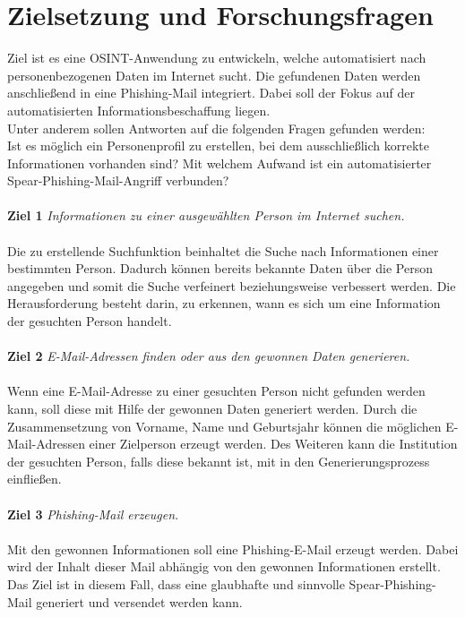 \section{Zielsetzung und Forschungsfragen}
\label {sec:Zielsetzung}
Ziel ist es eine OSINT-Anwendung zu entwickeln, welche automatisiert nach personenbezogenen Daten im Internet sucht. Die gefundenen Daten werden anschließend in eine Phishing-Mail integriert. Dabei soll der Fokus auf der automatisierten Informationsbeschaffung liegen.\\ 
Unter anderem sollen Antworten auf die folgenden Fragen gefunden werden:\\ Ist es möglich ein Personenprofil zu erstellen, bei dem ausschließlich korrekte Informationen vorhanden sind? Mit welchem Aufwand ist ein automatisierter Spear-Phishing-Mail-Angriff verbunden?
 \\\\
 {\bf Ziel 1} \textit{Informationen zu einer ausgewählten Person im Internet suchen.}\\\\
 Die zu erstellende Suchfunktion beinhaltet die Suche nach Informationen einer bestimmten Person. Dadurch können bereits bekannte Daten über die Person angegeben und somit die Suche verfeinert beziehungsweise verbessert werden. Die Herausforderung besteht darin, zu erkennen, wann es sich um eine Information der gesuchten Person handelt.\\\\
 {\bf Ziel 2} \textit{E-Mail-Adressen finden oder aus den gewonnen Daten generieren.}\\\\
 Wenn eine E-Mail-Adresse zu einer gesuchten Person nicht gefunden werden kann, soll diese mit Hilfe der gewonnen Daten generiert werden. Durch die Zusammensetzung von Vorname, Name und Geburtsjahr können die möglichen E-Mail-Adressen einer Zielperson erzeugt werden. Des Weiteren kann die Institution der gesuchten Person, falls diese bekannt ist, mit in den Generierungsprozess einfließen.\\\\
 {\bf Ziel 3} \textit{Phishing-Mail erzeugen.}\\\\
 Mit den gewonnen Informationen soll eine Phishing-E-Mail erzeugt werden. Dabei wird der Inhalt dieser Mail abhängig von den gewonnen Informationen erstellt. Das Ziel ist in diesem Fall, dass eine glaubhafte und sinnvolle Spear-Phishing-Mail generiert und versendet werden kann.
 

